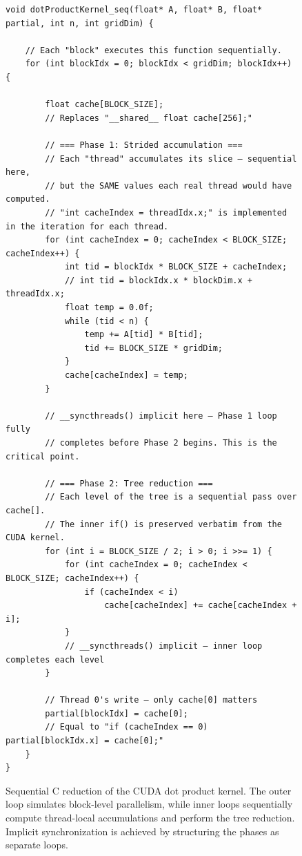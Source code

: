 \documentclass{article}
\begin{document}
\begin{figure}[H]
\begin{verbatim}
void dotProductKernel_seq(float* A, float* B, float* partial, int n, int gridDim) {

    // Each "block" executes this function sequentially.
    for (int blockIdx = 0; blockIdx < gridDim; blockIdx++) {

        float cache[BLOCK_SIZE];
        // Replaces "__shared__ float cache[256];"

        // === Phase 1: Strided accumulation ===
        // Each "thread" accumulates its slice — sequential here,
        // but the SAME values each real thread would have computed.
        // "int cacheIndex = threadIdx.x;" is implemented in the iteration for each thread.
        for (int cacheIndex = 0; cacheIndex < BLOCK_SIZE; cacheIndex++) {
            int tid = blockIdx * BLOCK_SIZE + cacheIndex;
            // int tid = blockIdx.x * blockDim.x + threadIdx.x;
            float temp = 0.0f;
            while (tid < n) {
                temp += A[tid] * B[tid];
                tid += BLOCK_SIZE * gridDim;
            }
            cache[cacheIndex] = temp;
        }

        // __syncthreads() implicit here — Phase 1 loop fully 
        // completes before Phase 2 begins. This is the critical point.

        // === Phase 2: Tree reduction ===
        // Each level of the tree is a sequential pass over cache[].
        // The inner if() is preserved verbatim from the CUDA kernel.
        for (int i = BLOCK_SIZE / 2; i > 0; i >>= 1) {
            for (int cacheIndex = 0; cacheIndex < BLOCK_SIZE; cacheIndex++) {
                if (cacheIndex < i)
                    cache[cacheIndex] += cache[cacheIndex + i];
            }
            // __syncthreads() implicit — inner loop completes each level
        }

        // Thread 0's write — only cache[0] matters
        partial[blockIdx] = cache[0];
        // Equal to "if (cacheIndex == 0) partial[blockIdx.x] = cache[0];"
    }
}
\end{verbatim}
\caption{Sequential C reduction of the CUDA dot product kernel. The outer loop simulates block-level parallelism, while inner loops sequentially compute thread-local accumulations and perform the tree reduction. Implicit synchronization is achieved by structuring the phases as separate loops.}
\label{fig:dot-product-c-conv}
\end{figure}
\end{document}
